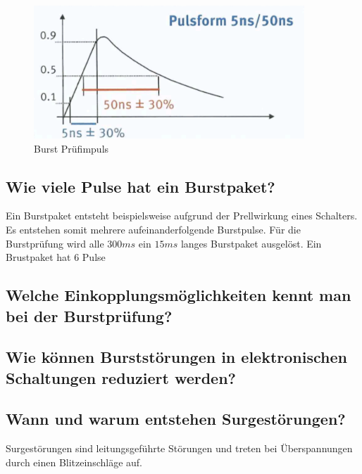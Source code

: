 \begin{figure}
  \centering
  \includegraphics[height=5cm]{src/assets/pictures/lv4_burst_impuls.png}
  \caption{Burst Prüfimpuls}\label{fig:lv4:burst_impuls}
\end{figure}

\subsection{Wie viele Pulse hat ein Burstpaket?}
Ein Burstpaket entsteht beispielsweise aufgrund der Prellwirkung eines Schalters. Es entstehen somit mehrere aufeinanderfolgende Burstpulse.\p
Für die Burstprüfung wird alle \(300ms\) ein \(15ms\) langes Burstpaket ausgelöst. Ein Brustpaket hat \(6\) Pulse

\subsection{Welche Einkopplungsmöglichkeiten kennt man bei der Burstprüfung?}

\subsection{Wie können Burststörungen in elektronischen Schaltungen reduziert werden?}

\subsection{Wann und warum entstehen Surgestörungen?}
Surgestörungen sind leitungsgeführte Störungen und treten bei Überspannungen durch einen Blitzeinschläge auf.

